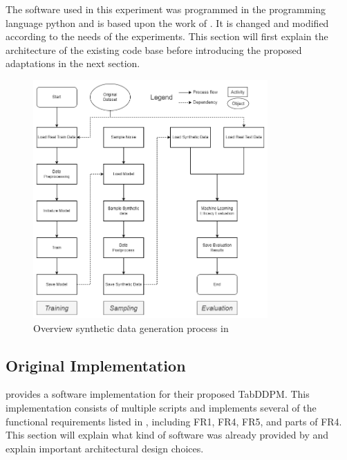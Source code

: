 The software \cite{akim2023TabDDPMModellingTabular} used in this experiment was programmed in the programming language python \cite{van1995python} and is based upon the work of \textcite{kotelnikov2022TabDDPMModellingTabular}.
It is changed and modified according to the needs of the experiments.
This section will first explain the architecture of the existing code base before introducing the proposed adaptations in the next section.

\begin{figure}[h]
	\centering
	\includegraphics[width=0.8\textwidth]{images/Overall_original.png}
	\caption[Overview Original Software]{Overview synthetic data generation process in \cite{akim2023TabDDPMModellingTabular}}
	\label{fig:overall_original}
\end{figure}


\subsection{Original Implementation}
\label{ch:conceptualDesign-existingCodeBase-originalImplementation}

\textcite{akim2023TabDDPMModellingTabular} provides a software implementation for their proposed TabDDPM.
This implementation consists of multiple scripts and implements several of the functional requirements listed in , including FR1, FR4, FR5, and parts of FR4.
This section will explain what kind of software was already provided by \cite{kotelnikov2022TabDDPMModellingTabular} and explain important architectural design choices.

